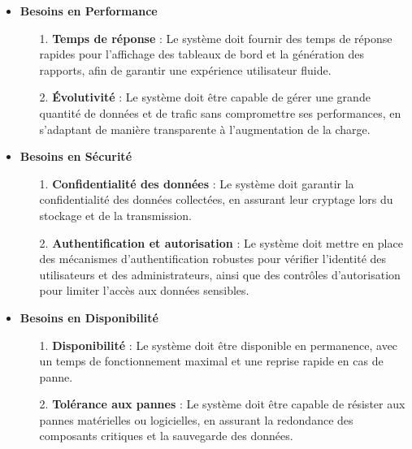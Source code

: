   \begin{itemize}
        \item\textbf{Besoins en Performance}

                \begin{enumerate}
                    \item[1.] \textbf{Temps de réponse} : Le système doit fournir des temps de réponse rapides pour l'affichage des tableaux de bord et la génération des rapports, afin de garantir une expérience utilisateur fluide.
                    
                    \item[2.] \textbf{Évolutivité} : Le système doit être capable de gérer une grande quantité de données et de trafic sans compromettre ses performances, en s'adaptant de manière transparente à l'augmentation de la charge.
                \end{enumerate}
    
        \item\textbf{Besoins en Sécurité}
    
                \begin{enumerate}
                    \item[1.] \textbf{Confidentialité des données} : Le système doit garantir la confidentialité des données collectées, en assurant leur cryptage lors du stockage et de la transmission.
                    
                    \item[2.] \textbf{Authentification et autorisation} : Le système doit mettre en place des mécanismes d'authentification robustes pour vérifier l'identité des utilisateurs et des administrateurs, ainsi que des contrôles d'autorisation pour limiter l'accès aux données sensibles.
                \end{enumerate}
    
        \item\textbf{Besoins en Disponibilité}
    
                \begin{enumerate}
                    \item[1.] \textbf{Disponibilité} : Le système doit être disponible en permanence, avec un temps de fonctionnement maximal et une reprise rapide en cas de panne.
                    
                    \item[2.] \textbf{Tolérance aux pannes} : Le système doit être capable de résister aux pannes matérielles ou logicielles, en assurant la redondance des composants critiques et la sauvegarde des données.
                \end{enumerate}
    

\end{itemize}
